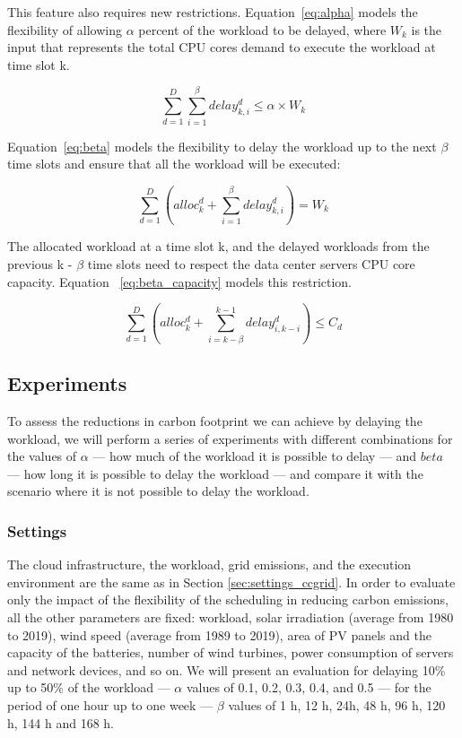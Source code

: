 This feature also requires new restrictions. Equation~\eqref{eq:alpha} models the flexibility of allowing $\alpha$ percent of the workload to be delayed, where $W_k$ is the input that represents the total CPU cores demand to execute the workload at time slot k.


\begin{equation} \label{eq:alpha}
   \sum_{d=1}^D  \sum_{i=1}^{\beta} delay_{k,i}^d \leq  \alpha   \times W_k
\end{equation}


Equation~\eqref{eq:beta} models the flexibility to delay the workload up to the next $\beta$ time slots and ensure that all the workload will be executed:


\begin{equation} \label{eq:beta}
       \sum_{d=1}^D    (alloc_k^d +    \sum_{i=1}^{\beta} delay_{k,i}^d) = W_k  
     \end{equation}

The allocated workload at a time slot k, and the delayed workloads from the previous k - $\beta$ time slots need to respect the data center servers CPU core capacity. Equation ~\eqref{eq:beta_capacity} models this restriction. 

\begin{equation} \label{eq:beta_capacity}
\sum_{d=1}^D    (alloc_k^d  +    \sum_{i=k-\beta}^{k-1} delay_{  i ,  k-i  }^d)  \leq C_d 
\end{equation}

\subsection{Experiments}

To assess the reductions in carbon footprint we can achieve by delaying the workload, we will perform a series of experiments with different combinations for the values of $\alpha$ --- how much of the workload it is possible to delay --- and $beta$ --- how long it is possible to delay the workload --- and compare it with the scenario where it is not possible to delay the workload. 

\subsubsection{Settings}

The cloud infrastructure, the workload, grid emissions, and the execution environment are the same as in Section  \ref{sec:settings_ccgrid}. In order to evaluate only the impact of the flexibility of the scheduling in reducing carbon emissions, all the other parameters are fixed: workload, solar irradiation (average from 1980 to 2019), wind speed (average from 1989 to 2019), area of PV panels and the capacity of the batteries, number of wind turbines, power consumption of servers and network devices, and so on. We will present an evaluation for delaying 10\% up to 50\% of the workload --- $\alpha$ values of 0.1, 0.2, 0.3, 0.4, and 0.5 --- for the period of one hour up to one week --- $\beta$ values of 1 h, 12 h, 24h, 48 h, 96 h, 120 h, 144 h and 168 h.

